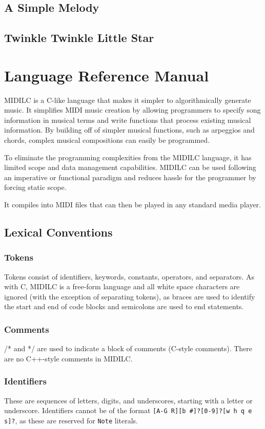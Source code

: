 \documentclass[12pt,A4]{book}
\begin{document}
\section{A Simple Melody}
\section{Twinkle Twinkle Little Star}
\chapter{Language Reference Manual}
MIDILC is a C-like language that makes it simpler to algorithmically generate music.  It simplifies MIDI music creation by allowing programmers to specify song information in musical terms and write functions that process existing musical information.  By building off of simpler musical functions, such as arpeggios and chords, complex musical compositions can easily be programmed.

To eliminate the programming complexities from the MIDILC language, it has limited scope and data management capabilities.  MIDILC can be used following an imperative or functional paradigm and reduces hassle for the programmer by forcing static scope.

It compiles into MIDI files that can then be played in any standard media player.

\section{Lexical Conventions}
\subsection{Tokens}
Tokens consist of identifiers, keywords, constants, operators, and separators.  As with C, MIDILC is a free-form language and all white space characters are ignored (with the exception of separating tokens), as braces are used to identify the start and end of code blocks and semicolons are used to end statements.
\subsection{Comments}
/* and */ are used to indicate a block of comments (C-style comments).  There are no C++-style comments in MIDILC.
\subsection{Identifiers}
These are sequences of letters, digits, and underscores, starting with a letter or underscore.  Identifiers cannot be of the format \verb|[A-G R][b #]?[0-9]?[w h q e s]?|, as these are reserved for \verb|Note| literals.
\end{document}
